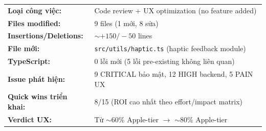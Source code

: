 \documentclass{article}
\begin{document}
\begin{tabularx}{\textwidth}{@{}l X@{}}
\textbf{Loại công việc:} & Code review + UX optimization (no feature added) \\
\textbf{Files modified:} & 9 files (1 mới, 8 sửa) \\
\textbf{Insertions/Deletions:} & ${\sim}+150 / -50$ lines \\
\textbf{File mới:} & \texttt{src/utils/haptic.ts} (haptic feedback module) \\
\textbf{TypeScript:} & 0 lỗi mới (5 lỗi pre-existing không liên quan) \\
\textbf{Issue phát hiện:} & 9 CRITICAL bảo mật, 12 HIGH backend, 5 PAIN UX \\
\textbf{Quick wins triển khai:} & 8/15 (ROI cao nhất theo effort/impact matrix) \\
\textbf{Verdict UX:} & Từ ${\sim}60\%$ Apple-tier $\to$ ${\sim}80\%$ Apple-tier \\
\end{tabularx}
\end{document}
